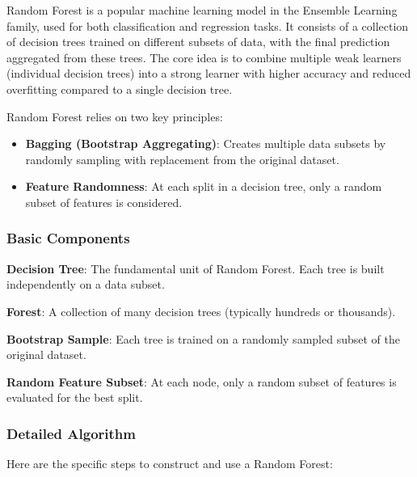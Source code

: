 Random Forest is a popular machine learning model in the Ensemble Learning family, used for both classification and regression tasks.
It consists of a collection of decision trees trained on different subsets of data, with the final prediction aggregated from these trees.
The core idea is to combine multiple weak learners (individual decision trees) into a strong learner with higher accuracy and reduced overfitting compared to a single decision tree.

Random Forest relies on two key principles:

\begin{itemize}
    \item \textbf{Bagging (Bootstrap Aggregating)}: Creates multiple data subsets by randomly sampling with replacement from the original dataset.
    \item \textbf{Feature Randomness}: At each split in a decision tree, only a random subset of features is considered.
\end{itemize}

\subsubsection{Basic Components}\text{}

\smallskip
\textbf{Decision Tree}: The fundamental unit of Random Forest.
Each tree is built independently on a data subset.

\textbf{Forest}: A collection of many decision trees (typically hundreds or thousands).

\textbf{Bootstrap Sample}: Each tree is trained on a randomly sampled subset of the original dataset.

\textbf{Random Feature Subset}: At each node, only a random subset of features is evaluated for the best split.

\smallskip
\subsubsection{Detailed Algorithm}\text{}

Here are the specific steps to construct and use a Random Forest:

